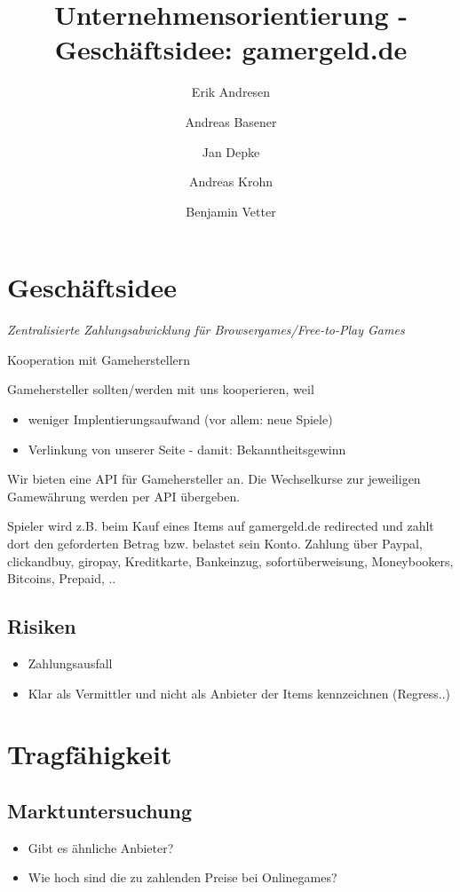 \documentclass[a4paper,10pt]{article}
\title{Unternehmensorientierung - Geschäftsidee: gamergeld.de}
\author{Erik Andresen \and Andreas Basener \and Jan Depke \and Andreas Krohn \and Benjamin Vetter}
\begin{document}
\maketitle

\section{Geschäftsidee}
\emph{Zentralisierte Zahlungsabwicklung für Browsergames/Free-to-Play Games}

Kooperation mit Gameherstellern

Gamehersteller sollten/werden mit uns kooperieren, weil
\begin{itemize}
  \item weniger Implentierungsaufwand (vor allem: neue Spiele)
  \item Verlinkung von unserer Seite - damit: Bekanntheitsgewinn
\end{itemize}

Wir bieten eine API für Gamehersteller an.
Die Wechselkurse zur jeweiligen Gamewährung werden per API übergeben.

Spieler wird z.B. beim Kauf eines Items auf gamergeld.de redirected und zahlt dort den geforderten Betrag bzw. belastet sein Konto.
Zahlung über Paypal, clickandbuy, giropay, Kreditkarte, Bankeinzug, sofortüberweisung, Moneybookers, Bitcoins, Prepaid, ..

\subsection{Risiken}
\begin{itemize}
  \item Zahlungsausfall
  \item Klar als Vermittler und nicht als Anbieter der Items kennzeichnen (Regress..)
\end{itemize}

\section{Tragfähigkeit}

\subsection{Marktuntersuchung}
\begin{itemize}
  \item Gibt es ähnliche Anbieter?
  \item Wie hoch sind die zu zahlenden Preise bei Onlinegames?
\end{itemize}
\end{document}

